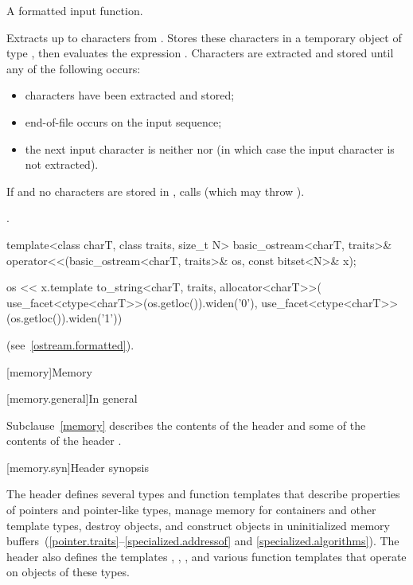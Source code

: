 \begin{itemdescr}
\pnum
A formatted input function.

\pnum
\effects
Extracts up to  characters from .
Stores these characters in a temporary object  of type
,
then evaluates the expression
.
Characters are extracted and stored until any of the following occurs:
\begin{itemize}
\item
{} characters have been extracted and stored;
\item
{}%
end-of-file occurs on the input sequence;
\item
the next input character is neither
nor
(in which case the input character is not extracted).
\end{itemize}

\pnum
If  and no characters are stored in , calls
(which may throw
).

\pnum
\returns
{}.
\end{itemdescr}

%
\begin{itemdecl}
template<class charT, class traits, size_t N>
  basic_ostream<charT, traits>&
    operator<<(basic_ostream<charT, traits>& os, const bitset<N>& x);
\end{itemdecl}

\begin{itemdescr}
\pnum
\returns
\begin{codeblock}
os << x.template to_string<charT, traits, allocator<charT>>(
  use_facet<ctype<charT>>(os.getloc()).widen('0'),
  use_facet<ctype<charT>>(os.getloc()).widen('1'))
\end{codeblock}
(see~\ref{ostream.formatted}).
\end{itemdescr}

[memory]{Memory}

[memory.general]{In general}

\pnum
Subclause~\ref{memory} describes the contents of the header
 and some
of the contents of the header .

[memory.syn]{Header  synopsis}

\pnum
The header  defines several types and function templates that
describe properties of pointers and pointer-like types, manage memory
for containers and other template types, destroy objects, and
construct objects in
uninitialized memory
buffers~(\ref{pointer.traits}--\ref{specialized.addressof} and \ref{specialized.algorithms}).
The header also defines the templates
, , , and various function
templates that operate on objects of these types.

